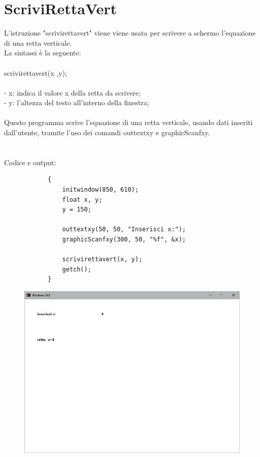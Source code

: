 \documentclass[12pt]{book}
\begin{document}
		\section{ScriviRettaVert}
					L'istruzione "scrivirettavert" viene viene usata per scrivere a schermo l'equazione di una retta verticale.
		\\La sintassi è la seguente:
		\\
		\\
		\Large scrivirettavert(x ,y);
		\normalsize
		\\
		\\- x: indica il valore x della retta da scrivere;
		\\- y: l'altezza del testo all'interno della finestra;
		\\
		\\Questo programma scrive l'equazione di una retta verticale, usando dati inseriti dall'utente, tramite l'uso dei comandi outtextxy e graphicScanfxy.
		\\ \\ \\
		Codice e output:
		\begin{lstlisting}
			{
				initwindow(850, 610);
				float x, y;
				y = 150;
				
				outtextxy(50, 50, "Inserisci x:");
				graphicScanfxy(300, 50, "%f", &x);

				scrivirettavert(x, y);
				getch();
			}
		\end{lstlisting}
		
		\begin{figure}[h]
			\includegraphics[scale=0.5]{scrivirettavertterminale1}
		\end{figure}
		\clearpage
\end{document}
